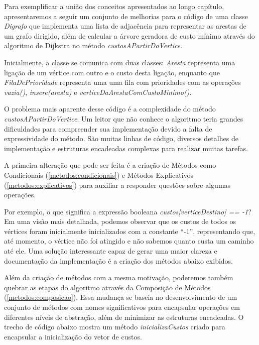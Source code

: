 Para exemplificar a união dos conceitos apresentados ao longo capítulo, apresentaremos a seguir um 
conjunto de melhorias para o código de uma classe \textit{Digrafo} que implementa uma lista de adjacência para 
representar as arestas de um grafo dirigido, além de calcular a árvore geradora de custo mínimo através do algoritmo de 
Dijkstra no método \textit{custosAPartirDoVertice}.

Inicialmente, a classe se comunica com duas classes: \textit{Aresta} representa uma ligação de um vértice com outro e o 
custo desta ligação, enquanto que \textit{FilaDePrioridade} representa uma uma fila com prioridades com as operações 
\textit{vazia()}, \textit{insere(aresta)} e \textit{verticeDaArestaComCustoMinimo()}.



O problema mais aparente desse código é a complexidade do método \textit{custosAPartirDoVertice}. Um leitor 
que não conhece o algoritmo teria grandes dificuldades para compreender sua implementação devido a falta de 
expressividade do método. São muitas linhas de código, diversos detalhes de implementação e estruturas encadeadas 
complexas para realizar muitas tarefas. 

A primeira alteração que pode ser feita é a criação de Métodos como Condicionais (\ref{metodos:condicionais}) e 
Métodos Explicativos (\ref{metodos:explicativos}) para auxiliar a responder questões sobre algumas operações.

Por exemplo, o que significa a expressão booleana \textit{custos[verticeDestino] == -1}? Em uma visão mais detalhada, 
podemos observar que os custos de todos os vértices foram inicialmente inicializados com a constante ``-1'', 
representando que, até momento, o vértice não foi atingido e não sabemos quanto custa um caminho até ele. Uma solução 
interessante capaz de gerar uma maior clareza e documentação da implementação é a criação dos métodos abaixo
exibidos.



Além da criação de métodos com a mesma motivação, poderemos também quebrar as etapas do algoritmo através da Composição 
de Métodos (\ref{metodos:composicao}). Essa mudança se baseia no desenvolvimento de um conjunto de métodos com nomes 
significativos para encapsular operações em diferentes níveis de abstração, além de minimizar as estruturas encadeadas.
O trecho de código abaixo mostra um método \textit{inicializaCustos} criado para encapsular a inicialização do vetor de 
custos.

